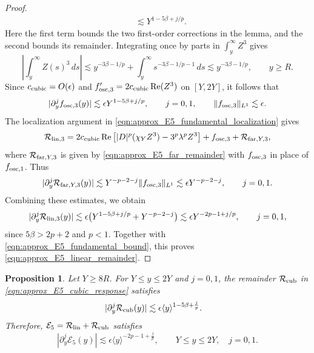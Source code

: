 \documentclass[11pt]{amsart}
\newtheorem{proposition}[theorem]{Proposition}
\theoremstyle{definition}
\theoremstyle{remark}
\numberwithin{equation}{section}
\newcommand{\mc}[1]{\mathcal{#1}}
\newcommand{\ang}[1]{\langle #1 \rangle}
\begin{document}
\begin{proof}
\[\begin{aligned}
        &\lesssim Y^{1-5\beta+j/p}.
    \end{aligned}
    \]
    Here the first term bounds the two first-order corrections in the lemma, and the second bounds its remainder. Integrating once by parts in $\int_y^\infty Z^3$ gives
    \[
        \left|\int_y^\infty Z(s)^3\,ds\right|
        \lesssim y^{-3\beta-1/p}
        +\int_y^\infty s^{-3\beta-1/p-1}\,ds
        \lesssim y^{-3\beta-1/p},\qquad y\geq R.
    \]
    Since $c_{\textup{cubic}}=O(\epsilon)$ and $f_{\textup{osc},3}'=2c_{\textup{cubic}}\operatorname{Re}(Z^3)$ on $[Y,2Y]$, it follows that
    \[
        |\partial_y^jf_{\textup{osc},3}(y)|\lesssim\epsilon Y^{1-5\beta+j/p},
        \qquad j=0,1,\qquad \|f_{\textup{osc},3}\|_{L^1}\lesssim\epsilon.
    \]
    The localization argument in \eqref{eqn:approx_E5_fundamental_localization} gives
    \[
        \mc{R}_{\textup{lin},3}
        =2c_{\textup{cubic}}\operatorname{Re}\left[|D|^p(\chi_YZ^3)-3^p\lambda^pZ^3\right]
        +f_{\textup{osc},3}+\mc{R}_{\textup{far},Y,3},
    \]
    where $\mc{R}_{\textup{far},Y,3}$ is given by \eqref{eqn:approx_E5_far_remainder} with $f_{\textup{osc},3}$ in place of $f_{\textup{osc},1}$. Thus
    \[
        |\partial_y^j\mc{R}_{\textup{far},Y,3}(y)|
        \lesssim Y^{-p-2-j}\|f_{\textup{osc},3}\|_{L^1}
        \lesssim\epsilon Y^{-p-2-j},\qquad j=0,1.
    \]
    Combining these estimates, we obtain
    \begin{equation}\label{eqn:approx_E5_third_harmonic_bound}
        |\partial_y^j\mc{R}_{\textup{lin},3}(y)|
        \lesssim\epsilon\bigl(Y^{1-5\beta+j/p}+Y^{-p-2-j}\bigr)
        \lesssim\epsilon Y^{-2p-1+j/p},\qquad j=0,1,
    \end{equation}
    since $5\beta>2p+2$ and $p<1$. Together with \eqref{eqn:approx_E5_fundamental_bound}, this proves \eqref{eqn:approx_E5_linear_remainder}.

\end{proof}

\begin{proposition}\label{prop:approx_E5_cubic}
    Let $Y\geq8R$. For $Y\leq y\leq2Y$ and $j=0,1$, the remainder $\mc{R}_{\textup{cub}}$ in \eqref{eqn:approx_E5_cubic_response} satisfies
    \begin{align}
        |\partial_y^j\mc{R}_{\textup{cub}}(y)|
        &\lesssim\epsilon\ang{y}^{1-5\beta+\frac{j}{p}}.
        \label{eqn:approx_E5_cubic_remainder}
    \end{align}
    Therefore, $\mc{E}_5=\mc{R}_{\textup{lin}}+\mc{R}_{\textup{cub}}$ satisfies
    \begin{equation}\label{eqn:approx_E5_bound}
        |\partial_y^j\mc{E}_5(y)|
        \lesssim\epsilon\ang{y}^{-2p-1+\frac{j}{p}},
        \qquad Y\leq y\leq2Y,\quad j=0,1.
    \end{equation}
\end{proposition}
\end{document}
